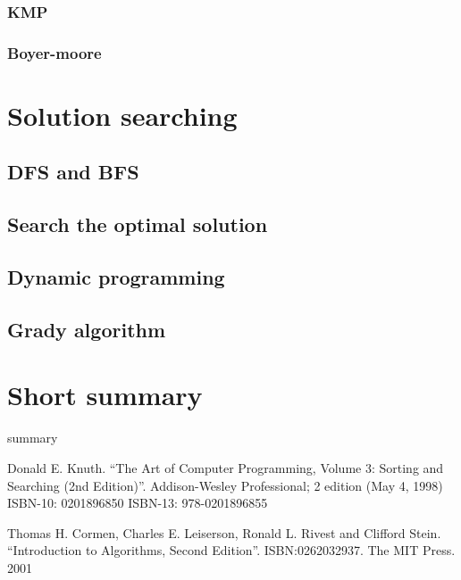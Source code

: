 \documentclass{article}
\begin{document}
\subsubsection{KMP}

\subsubsection{Boyer-moore}

\section{Solution searching}
\subsection{DFS and BFS}

\subsection{Search the optimal solution}

\subsection{Dynamic programming}

\subsection{Grady algorithm}

\section{Short summary} 
summary

\begin{thebibliography}{99}

Donald E. Knuth. ``The Art of Computer Programming, Volume 3: Sorting and Searching (2nd Edition)''. Addison-Wesley Professional; 2 edition (May 4, 1998) ISBN-10: 0201896850 ISBN-13: 978-0201896855

Thomas H. Cormen, Charles E. Leiserson, Ronald L. Rivest and Clifford Stein. 
``Introduction to Algorithms, Second Edition''. ISBN:0262032937. The MIT Press. 2001

\end{thebibliography}

\ifx\wholebook\relax\else
\end{document}
